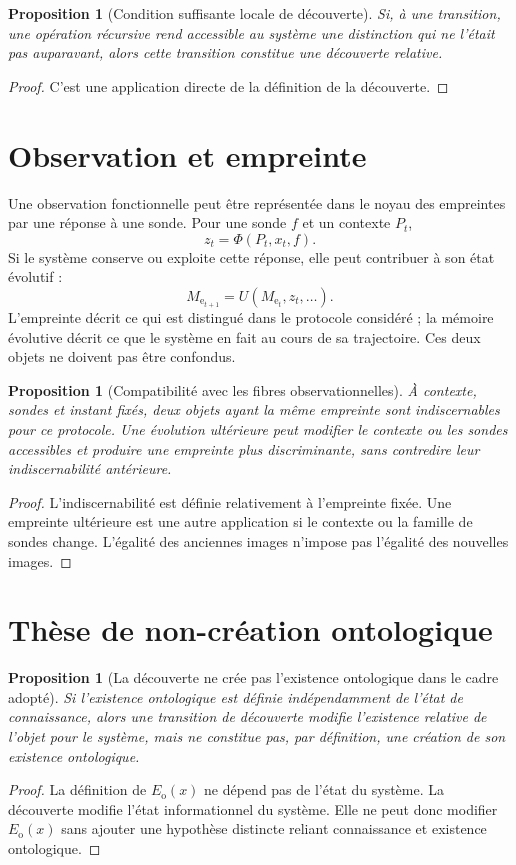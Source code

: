\documentclass[11pt,a4paper,openany]{book}
\newtheorem{proposition}[definition]{Proposition}
\newcommand{\Mevo}{M_{\mathrm{e}}}
\begin{document}
\begin{proposition}[Condition suffisante locale de découverte]
Si, à une transition, une opération récursive rend accessible au système une distinction qui ne l'était pas auparavant, alors cette transition constitue une découverte relative.
\end{proposition}
\begin{proof}
C'est une application directe de la définition de la découverte.\end{proof}

\section{Observation et empreinte}
Une observation fonctionnelle peut être représentée dans le noyau des empreintes par une réponse à une sonde. Pour une sonde $f$ et un contexte $P_t$,
\[
z_t=\Phi(P_t,x_t,f).
\]
Si le système conserve ou exploite cette réponse, elle peut contribuer à son état évolutif :
\[
\Mevo_{t+1}=U(\Mevo_t,z_t,\ldots).
\]
L'empreinte décrit ce qui est distingué dans le protocole considéré ; la mémoire évolutive décrit ce que le système en fait au cours de sa trajectoire. Ces deux objets ne doivent pas être confondus.

\begin{proposition}[Compatibilité avec les fibres observationnelles]
À contexte, sondes et instant fixés, deux objets ayant la même empreinte sont indiscernables pour ce protocole. Une évolution ultérieure peut modifier le contexte ou les sondes accessibles et produire une empreinte plus discriminante, sans contredire leur indiscernabilité antérieure.
\end{proposition}
\begin{proof}
L'indiscernabilité est définie relativement à l'empreinte fixée. Une empreinte ultérieure est une autre application si le contexte ou la famille de sondes change. L'égalité des anciennes images n'impose pas l'égalité des nouvelles images.\end{proof}

\section{Thèse de non-création ontologique}
\begin{proposition}[La découverte ne crée pas l'existence ontologique dans le cadre adopté]
Si l'existence ontologique est définie indépendamment de l'état de connaissance, alors une transition de découverte modifie l'existence relative de l'objet pour le système, mais ne constitue pas, par définition, une création de son existence ontologique.
\end{proposition}
\begin{proof}
La définition de $E_{\mathrm{o}}(x)$ ne dépend pas de l'état du système. La découverte modifie l'état informationnel du système. Elle ne peut donc modifier $E_{\mathrm{o}}(x)$ sans ajouter une hypothèse distincte reliant connaissance et existence ontologique.\end{proof}
\end{document}
